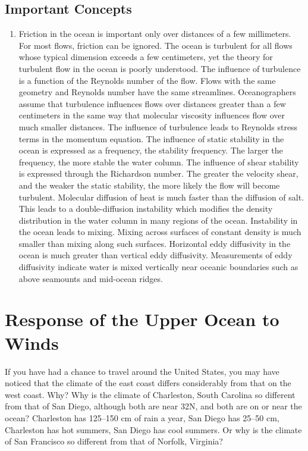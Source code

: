 \section{Important Concepts}
\begin{enumerate}
\item
Friction in the ocean is important only over distances of a few
millimeters. For most flows, friction can be ignored.
\vitem The ocean is turbulent for all flows whose typical dimension exceeds a few
centimeters, yet the theory for turbulent flow in the ocean is poorly understood.
\vitem
The influence of turbulence is a function of the Reynolds
number of the flow. Flows with the same geometry and Reynolds number have the same
streamlines.
\vitem
Oceanographers assume that turbulence influences flows over
distances greater than a few centimeters in the same way that molecular
viscosity influences flow over much smaller distances.
\vitem
The influence of turbulence leads to Reynolds stress terms
in the momentum equation.
\vitem
The influence of static stability in the ocean is expressed as a
frequency, the stability frequency. The larger the frequency, the
more stable the water column.
\vitem
The influence of shear stability is expressed through the Richardson
number. The greater the velocity shear, and the weaker the static stability, the
more likely the flow will become turbulent.
\vitem
Molecular diffusion of heat is much faster than the diffusion of salt.
This leads to a double-diffusion instability which modifies the density
distribution in the water column in many regions of the ocean.
\vitem
Instability in the ocean leads to mixing. Mixing across surfaces of
constant density is much smaller than mixing along such surfaces.
\vitem
Horizontal eddy diffusivity in the ocean is much greater than vertical eddy
diffusivity.
\vitem
Measurements of eddy diffusivity indicate water is mixed vertically near
oceanic boundaries such as above seamounts and mid-ocean ridges.
\end{enumerate}


\chapter{Response of the Upper Ocean to Winds}
If you have had a chance to travel around the United States, you may have noticed
that the climate of the east coast differs considerably from that on the west
coast. Why? Why is the climate of Charleston, South Carolina so different from
that of San Diego, although both are near 32\degrees N, and both are on or near
the ocean? Charleston has 125--150 cm of rain a year, San Diego has 25--50 cm,
Charleston has hot summers, San Diego has cool summers. Or why is the climate of
San Francisco so different from that of Norfolk, Virginia?

